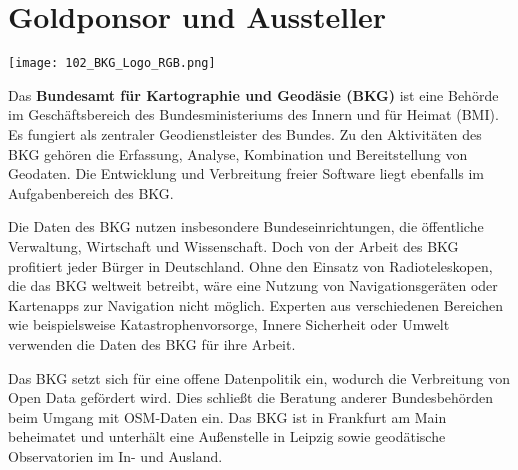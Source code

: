 \section*{Goldponsor und Aussteller}
\begin{flushright}
\texttt{[image: 102\_BKG\_Logo\_RGB.png]}
\end{flushright}
\noindent
Das {\bfseries Bundesamt für Kartographie und Geodäsie (BKG)} ist eine Behörde im Geschäftsbereich des Bundesministeriums des Innern und für Heimat (BMI). Es fungiert als zentraler Geodienstleister des Bundes. Zu den Aktivitäten des BKG gehören die Erfassung, Analyse, Kombination und Bereitstellung von Geodaten. Die Entwicklung und Verbreitung freier Software liegt ebenfalls im Aufgabenbereich des BKG. 

\noindent
Die Daten des BKG nutzen insbesondere Bundeseinrichtungen, die öffentliche Verwaltung, Wirtschaft und Wissenschaft. Doch von der Arbeit des BKG profitiert jeder Bürger in Deutschland. Ohne den Einsatz von Radioteleskopen, die das BKG weltweit betreibt, wäre eine Nutzung von Navigationsgeräten oder Kartenapps zur Navigation nicht möglich. Experten aus verschiedenen Bereichen wie beispielsweise Katastrophenvorsorge, Innere Sicherheit oder Umwelt verwenden die Daten des BKG für ihre Arbeit. 

\noindent
Das BKG setzt sich für eine offene Datenpolitik ein, wodurch die Verbreitung von Open Data gefördert wird. Dies schließt die Beratung anderer Bundesbehörden beim Umgang mit OSM-Daten ein.
Das BKG ist in Frankfurt am Main beheimatet und unterhält eine Außenstelle in Leipzig sowie geodätische Observatorien im In- und Ausland.

